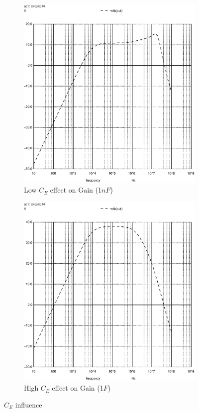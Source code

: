 \begin{figure}[h]
\centering
\begin{subfigure}{.5\textwidth}
    \centering
    \includegraphics[scale=0.33]{images/celow_1n.eps}
    \caption{Low $C_E$ effect on Gain (1$nF$)}
\end{subfigure}%
\begin{subfigure}{.5\textwidth}
    \centering
    \includegraphics[scale=0.33]{images/cehigh_1.eps}
    \caption{High $C_E$ effect on Gain (1$F$)}
\end{subfigure}
\caption{$C_E$ influence}
\end{figure}


